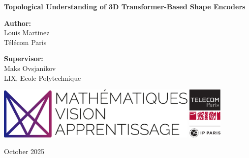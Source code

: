 \documentclass[11pt,a4paper]{article}
\newcommand{\ThesisTitle}{Topological Understanding of 3D Transformer-Based Shape Encoders}
\newcommand{\AuthorName}{Louis Martinez}
\newcommand{\AuthorAffiliation}{Télécom Paris}
\newcommand{\SupervisorName}{Maks Ovsjanikov}
\newcommand{\SupervisorAffiliation}{LIX, Ecole Polytechnique}
\newcommand{\MonthYear}{October 2025}
\begin{document}
\begin{titlepage}
    \centering
    \vspace*{2cm}

    {\LARGE\bfseries \ThesisTitle\par}
    \vspace{1.6cm}

    {\large \textbf{Author:} \\ \AuthorName \\[0.2cm]
    \AuthorAffiliation\par}

    \vspace{1.0cm}

    {\large \textbf{Supervisor:} \\ \SupervisorName \\[0.2cm]
    \SupervisorAffiliation\par}

    \vfill
    \begin{center}
        \includegraphics[height=2.6cm]{logos/logo_mva.pdf}\hspace{1.2cm}%
        \includegraphics[height=2.6cm]{logos/logo_tp.pdf}
    \end{center}
    \vfill

    {\large \MonthYear\par}
\end{titlepage}

\setcounter{page}{1}
\tableofcontents
\clearpage


\clearpage







\appendix


\printbibliography
\end{document}
